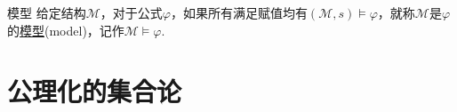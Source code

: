 \documentclass[main.tex]{subfiles}
\begin{document}
\begin{definition}{模型}
    给定结构\(\mathcal{M}\)，对于公式\(\varphi\)，如果所有满足赋值均有\((\mathcal{M}, s) \vDash \varphi\)，就称\(\mathcal{M}\)是\(\varphi\)的\uline{模型}(model)，记作\(\mathcal{M} \vDash \varphi\). 
\end{definition}

\section{公理化的集合论}





\end{document}
